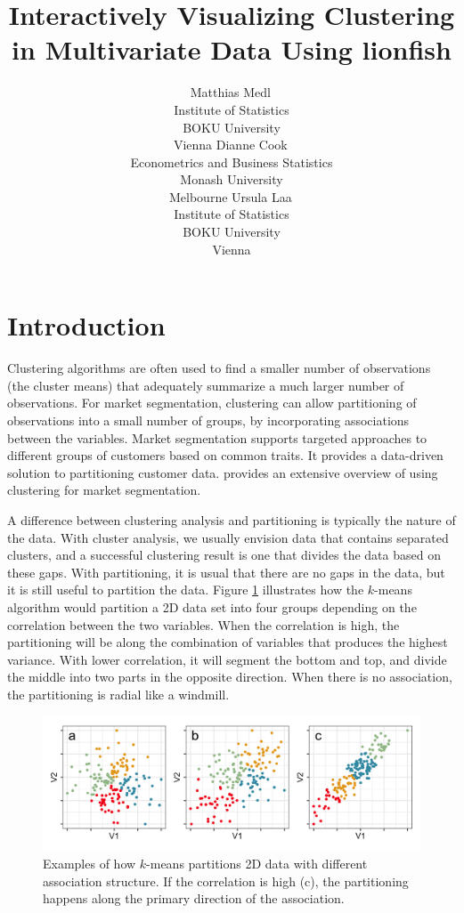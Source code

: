 \documentclass[article]{ajs}
\author{Matthias Medl\,\orcidlink{0000-0002-3354-4579}\\ Institute of Statistics \\ BOKU University \\ Vienna \And 
        Dianne Cook\,\orcidlink{0000-0002-3813-7155}\\ Econometrics and Business Statistics \\ Monash University \\ Melbourne \And
        Ursula Laa\,\orcidlink{0000-0002-0249-6439}\\ Institute of Statistics \\ BOKU University \\ Vienna}
\title{Interactively Visualizing Clustering in Multivariate Data Using lionfish}
\begin{document}
\section{Introduction}

Clustering algorithms are often used to find a smaller number of observations (the cluster means) that adequately summarize a much larger number of observations. For market segmentation, clustering can allow partitioning of observations into a small number of groups, by incorporating associations between the variables. Market segmentation supports targeted approaches to different groups of customers based on common traits.  It provides a data-driven solution to partitioning customer data. \cite{leisch2018market} provides an extensive overview of using clustering for market segmentation. 

A difference between clustering analysis and partitioning is typically the nature of the data. With cluster analysis, we usually envision data that contains separated clusters, and a successful clustering result is one that divides the data based on these gaps. With partitioning, it is usual that there are no gaps in the data, but it is still useful to partition the data. Figure \ref{kmeans-partition} illustrates how the $k$-means algorithm would partition a 2D data set into four groups depending on the correlation between the two variables.  When the correlation is high, the partitioning will be along the combination of variables that produces the highest variance. With lower correlation, it will segment the bottom and top, and divide the middle into two parts in the opposite direction. When there is no association, the partitioning is radial like a windmill.

\begin{figure}[h]
\centerline{\includegraphics[width=1\textwidth]{images/intro1.png}}
\caption{Examples of how $k$-means partitions 2D data with different association structure. If the correlation is high (c), the partitioning happens along the primary direction of the association.}
\label{kmeans-partition}
\end{figure}
\end{document}
